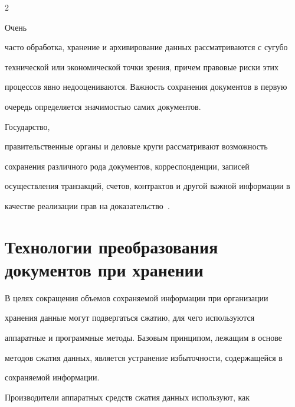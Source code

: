 \begin{multicols}{2}
{ %





}





Очень 


часто обработка, хранение и архивирование данных рассматриваются с сугубо 


технической или экономической точки зрения, причем правовые риски этих 


процессов явно недооцениваются. Важность сохранения документов в первую 


очередь определяется значимостью самих доку\-ментов. 


{





}





Государство, 


правительственные органы и деловые круги рассматривают возможность 


сохранения различного рода документов, корреспонденции, записей 


осуществления транзакций, счетов, контрактов и другой важной информации в 


качестве реализации прав на доказательство~\cite{10che}. 





\section{Технологии преобразования документов при хранении}


     


     В целях сокращения объемов сохраняемой информации при организации 


хранения данные могут подвергаться сжатию, для чего используются 


аппаратные и программные методы. Базовым принципом, лежащим в основе 


методов сжатия данных, является устранение избыточности, содержащейся в 


сохраняемой информации.


     


     Производители аппаратных средств сжатия данных используют, как 



\end{multicols}
